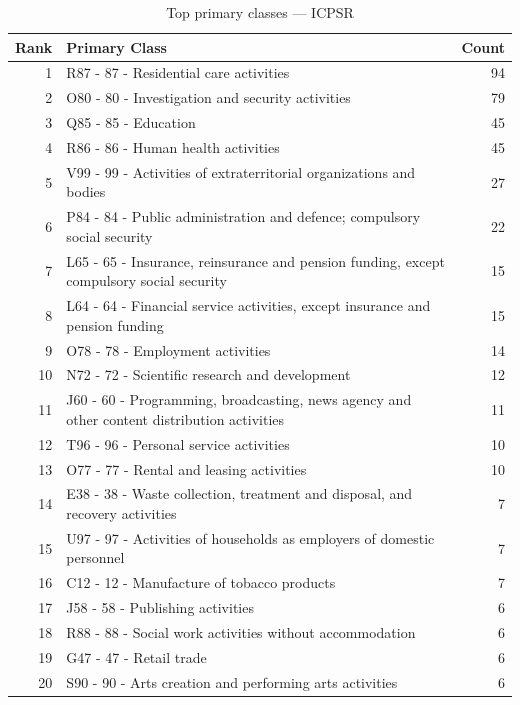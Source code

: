\begin{table}[h]
    \centering
    \begin{tabular}{r p{10cm} r}
    \hline
    \textbf{Rank} & \textbf{Primary Class} & \textbf{Count} \\
    \hline
    1 & R87 - 87 - Residential care activities & 94 \\
    2 & O80 - 80 - Investigation and security activities & 79 \\
    3 & Q85 - 85 - Education & 45 \\
    4 & R86 - 86 - Human health activities & 45 \\
    5 & V99 - 99 - Activities of extraterritorial organizations and bodies & 27 \\
    6 & P84 - 84 - Public administration and defence; compulsory social security & 22 \\
    7 & L65 - 65 - Insurance, reinsurance and pension funding, except compulsory social security & 15 \\
    8 & L64 - 64 - Financial service activities, except insurance and pension funding & 15 \\
    9 & O78 - 78 - Employment activities & 14 \\
    10 & N72 - 72 - Scientific research and development & 12 \\
    11 & J60 - 60 - Programming, broadcasting, news agency and other content distribution activities & 11 \\
    12 & T96 - 96 - Personal service activities & 10 \\
    13 & O77 - 77 - Rental and leasing activities & 10 \\
    14 & E38 - 38 - Waste collection, treatment and disposal, and recovery activities & 7 \\
    15 & U97 - 97 - Activities of households as employers of domestic personnel & 7 \\
    16 & C12 - 12 - Manufacture of tobacco products & 7 \\
    17 & J58 - 58 - Publishing activities & 6 \\
    18 & R88 - 88 - Social work activities without accommodation & 6 \\
    19 & G47 - 47 - Retail trade & 6 \\
    20 & S90 - 90 - Arts creation and performing arts activities & 6 \\
    \hline
    \end{tabular}
    \caption{Top primary classes --- ICPSR}
\end{table}

